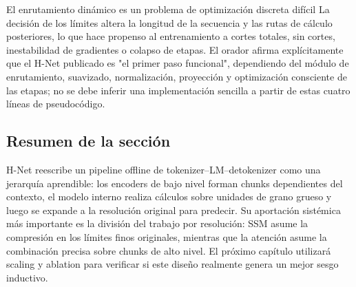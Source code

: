 \begin{warningbox}{El enrutamiento dinámico es un problema de optimización discreta difícil}
La decisión de los límites altera la longitud de la secuencia y las rutas de cálculo posteriores, lo que hace propenso al entrenamiento a cortes totales, sin cortes, inestabilidad de gradientes o colapso de etapas. El orador afirma explícitamente que el H-Net publicado es "el primer paso funcional", dependiendo del módulo de enrutamiento, suavizado, normalización, proyección y optimización consciente de las etapas; no se debe inferir una implementación sencilla a partir de estas cuatro líneas de pseudocódigo.
\end{warningbox}


\subsection{Resumen de la sección}

H-Net reescribe un pipeline offline de tokenizer--LM--detokenizer como una jerarquía aprendible: los encoders de bajo nivel forman chunks dependientes del contexto, el modelo interno realiza cálculos sobre unidades de grano grueso y luego se expande a la resolución original para predecir. Su aportación sistémica más importante es la división del trabajo por resolución: SSM asume la compresión en los límites finos originales, mientras que la atención asume la combinación precisa sobre chunks de alto nivel. El próximo capítulo utilizará scaling y ablation para verificar si este diseño realmente genera un mejor sesgo inductivo.


